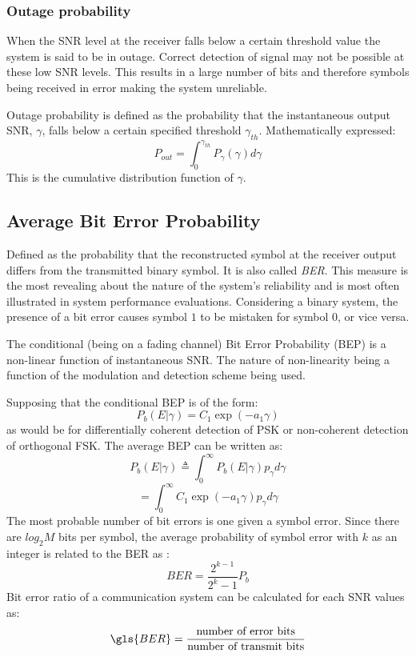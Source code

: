 \subsubsection{Outage probability}
When the \gls{SNR} level at the receiver falls below a certain threshold value the system is said to be in outage. Correct detection of signal may not be possible at these low \gls{SNR} levels. This results in a large number of bits and therefore \gls{symbol}s being received in error making the system unreliable\cite{MIMO}.

Outage probability is defined as the probability that the instantaneous output \gls{SNR}, $\gamma$, falls below a certain specified threshold $\gamma_{th}$\cite{dcommoha}. Mathematically expressed:
$$P_{out} = \int_0^{\gamma_{th}} P_{\gamma}\left(\gamma\right) d\gamma$$
This is the cumulative distribution function of $\gamma$.

\subsection{Average Bit Error Probability}
Defined as the probability that the reconstructed \gls{symbol} at the receiver output differs from the transmitted binary \gls{symbol}. It is also called \textit{\gls{BER}}. This measure is the most revealing about the nature of the system's reliability and is most often illustrated in system performance evaluations. Considering a binary system, the presence of a bit error causes \gls{symbol} $1$ to be mistaken for \gls{symbol} $0$, or
vice versa.\cite{hayk} 

The conditional (being on a fading channel) Bit Error Probability (BEP) is a non-linear function of instantaneous \gls{SNR}. The nature of non-linearity being a function of the modulation and detection scheme being used.\cite{dcommoha}

Supposing that the conditional BEP is of the form:
$$P_b\left( E|\gamma\right) = C_1 \exp \left( -a_1\gamma\right)$$
as would be for differentially coherent detection of \gls{PSK} or non-coherent detection of orthogonal \gls{FSK}. The average BEP can be written as:
$$P_b\left( E|\gamma\right) \triangleq \int_0^{\infty} P_b\left( E|\gamma\right) p_{\gamma}d\gamma$$
$$=\int_0^{\infty} C_1 \exp \left( -a_1\gamma\right) p_{\gamma}d\gamma$$
The most probable number of bit errors is one given a \gls{symbol} error. Since there are $log_2 M$ bits per
\gls{symbol}, the average probability of \gls{symbol} error with $k$ as an integer is related to the BER as :
$$BER=\frac{2^{k-1}}{2^{k}-1}P_b$$
Bit error ratio of a communication system can be calculated for each \gls{SNR} values as:
$$ \gls{BER}=\frac{\text{number  of  error  bits}}{\text{number  of  transmit  bits}}$$

